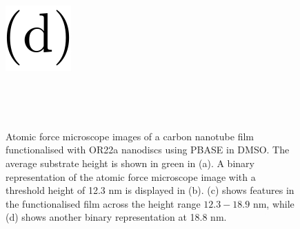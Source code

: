 \documentclass[
  a4paper,
]{scrbook}
\begin{document}
\begin{figure}
\begin{minipage}[t]{0.03\linewidth}
{{\includegraphics{figures/(d).png}

}

}

\end{minipage}%
%
\begin{minipage}[t]{0.01\linewidth}

{\centering 

~

}

\end{minipage}%
%
\begin{minipage}[t]{0.45\linewidth}

{\centering 


}

\end{minipage}%
%
\begin{minipage}[t]{0.01\linewidth}

{\centering 

~

}

\end{minipage}%

\caption{\label{fig-DMSO-AFM-comparison}Atomic force microscope images
of a carbon nanotube film functionalised with OR22a nanodiscs using
PBASE in DMSO. The average substrate height is shown in green in (a). A
binary representation of the atomic force microscope image with a
threshold height of 12.3 nm is displayed in (b). (c) shows features in
the functionalised film across the height range \(12.3-18.9\) nm, while
(d) shows another binary representation at 18.8 nm.}

\end{figure}
\end{document}

